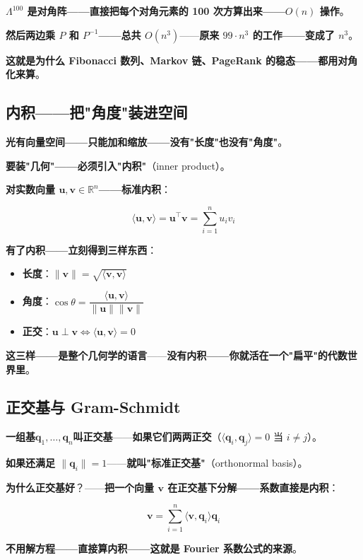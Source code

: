 \textbf{$\Lambda^{100}$ 是对角阵——直接把每个对角元素的 100 次方算出来——$O(n)$ 操作}。

\textbf{然后两边乘 $P$ 和 $P^{-1}$——总共 $O(n^3)$}——\textbf{原来 $99 \cdot n^3$ 的工作——变成了 $n^3$}。

\textbf{这就是为什么 Fibonacci 数列、Markov 链、PageRank 的稳态——都用对角化来算}。

\subsection{内积——把"角度"装进空间}

\textbf{光有向量空间——只能加和缩放——没有"长度"也没有"角度"}。

\textbf{要装"几何"——必须引入"内积"}（inner product）。

\textbf{对实数向量 $\bm{u}, \bm{v} \in \mathbb{R}^n$——标准内积}：

\[
\langle \bm{u}, \bm{v} \rangle = \bm{u}^\top \bm{v} = \sum_{i=1}^n u_i v_i
\]

\textbf{有了内积——立刻得到三样东西}：

\begin{itemize}
\item \textbf{长度}：\;$\|\bm{v}\| = \sqrt{\langle \bm{v}, \bm{v} \rangle}$
\item \textbf{角度}：\;$\cos\theta = \dfrac{\langle \bm{u}, \bm{v} \rangle}{\|\bm{u}\|\|\bm{v}\|}$
\item \textbf{正交}：\;$\bm{u} \perp \bm{v} \iff \langle \bm{u}, \bm{v} \rangle = 0$
\end{itemize}

\textbf{这三样——是整个几何学的语言}——\textbf{没有内积——你就活在一个"扁平"的代数世界里}。

\subsection{正交基与 Gram-Schmidt}

\textbf{一组基}\;$\bm{q}_1, \dots, \bm{q}_n$\;\textbf{叫正交基}——\textbf{如果它们两两正交}（$\langle \bm{q}_i, \bm{q}_j \rangle = 0$ 当 $i\neq j$）。

\textbf{如果还满足 $\|\bm{q}_i\| = 1$}——\textbf{就叫"标准正交基"}（orthonormal basis）。

\textbf{为什么正交基好}？——\textbf{把一个向量 $\bm{v}$ 在正交基下分解——系数直接是内积}：

\[
\bm{v} = \sum_{i=1}^n \langle \bm{v}, \bm{q}_i \rangle \bm{q}_i
\]

\textbf{不用解方程——直接算内积——这就是 Fourier 系数公式的来源}。

